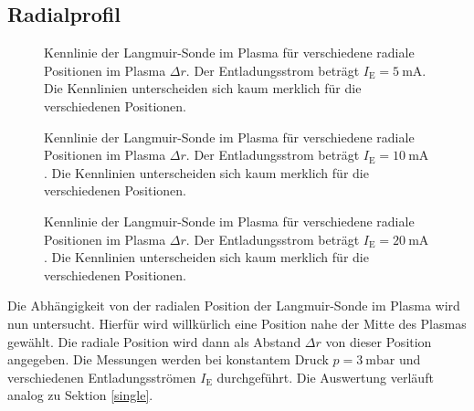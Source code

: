 \subsection{Radialprofil}\label{radial}
\begin{figure}[htbp]
    \centering
    
    \caption{
        Kennlinie der Langmuir-Sonde im Plasma f\"ur verschiedene radiale Positionen im Plasma $\Delta r$.
        Der Entladungsstrom betr\"agt $I_\text{E}=\SI{5}{\milli\ampere}$.
        Die Kennlinien unterscheiden sich kaum merklich f\"ur die verschiedenen Positionen.
    }
    \label{radial_KL_I5}
\end{figure}
\begin{figure}[htbp]
    \centering
    
    \caption{
        Kennlinie der Langmuir-Sonde im Plasma f\"ur verschiedene radiale Positionen im Plasma $\Delta r$.
        Der Entladungsstrom betr\"agt $I_\text{E}=\SI{10}{\milli\ampere}$.
        Die Kennlinien unterscheiden sich kaum merklich f\"ur die verschiedenen Positionen.
    }
    \label{radial_KL_I10}
\end{figure}
\begin{figure}[htbp]
    \centering
    
    \caption{
        Kennlinie der Langmuir-Sonde im Plasma f\"ur verschiedene radiale Positionen im Plasma $\Delta r$.
        Der Entladungsstrom betr\"agt $I_\text{E}=\SI{20}{\milli\ampere}$.
        Die Kennlinien unterscheiden sich kaum merklich f\"ur die verschiedenen Positionen.
    }
    \label{radial_KL_I20}
\end{figure}

Die Abh\"angigkeit von der radialen Position der Langmuir-Sonde im Plasma wird nun untersucht.
Hierf\"ur wird willk\"urlich eine Position nahe der Mitte des Plasmas gew\"ahlt.
Die radiale Position wird dann als Abstand $\Delta r$ von dieser Position angegeben.
Die Messungen werden bei konstantem Druck $p=\SI{3}{\milli\bar}$ und verschiedenen Entladungsstr\"omen $I_\text{E}$ durchgef\"uhrt.
Die Auswertung verl\"auft analog zu Sektion \ref{single}.

